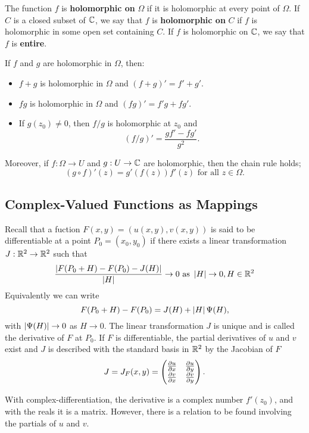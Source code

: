 \documentclass{exam}
\begin{document}
The function $f$ is \textbf{holomorphic on} $\Omega$ if it is holomorphic at every point of $\Omega$.
If $C$ is a closed subset of $\mathbb{C}$, we say that $f$ is \textbf{holomorphic on} $C$ if $f$ is holomorphic
in some open set containing $C$. If $f$ is holomorphic on $\mathbb{C}$, we say that $f$ is \textbf{entire}.

\newpage
\noqed
\begin{proposition}\label{prop:main}
    If $f$ and $g$ are holomorphic in $\Omega$, then:
    \begin{itemize}
        \item $f + g$ is holomorphic in $\Omega$ and $(f + g)' = f' + g'$.

        \item $fg$ is holomorphic in $\Omega$ and $(fg)' = f'g + fg'$.

        \item If $g(z_0) \neq 0$, then $f/g$ is holomorphic at $z_0$ and
        $$(f/g)' = \frac{gf' - fg'}{g^2}.$$
    \end{itemize}

    Moreover, if $f: \Omega\to U$ and $g: U\to\mathbb{C}$ are holomorphic, then the chain rule holds;
    $$(g\circ f)'(z) = g'(f(z))f'(z) \text{ for all } z\in\Omega.$$
\end{proposition}
\yesqed


\subsection*{Complex-Valued Functions as Mappings}
Recall that a fuction $F(x, y) = (u(x, y), v(x, y))$ is said to be differentiable at a point $P_0 = (x_0, y_0)$ if there exists a linear
transformation $J: \mathbb {R}^2\to\mathbb {R}^2$ such that
$$\frac{\left| F(P_0 + H) - F(P_0) - J(H) \right|}{\left| H \right|} \to 0 \text{ as } \left| H \right|\to 0, H\in\mathbb {R}^2$$
Equivalently we can write
$$F(P_0 + H) - F(P_0) = J(H) + \left| H \right|\Psi(H),$$
with $\left| \Psi(H) \right| \to 0$ as $H \to 0$. The linear transformation $J$ is unique and is called the derivative of $F$ at $P_0$. If $F$ is
differentiable, the partial derivatives of $u$ and $v$ exist and $J$ is described with the standard basis in $\mathbb {R}^2$ by the Jacobian of $F$
$$J = J_F(x, y) = 
\left( \begin{matrix}
    \frac{\partial u}{\partial x} & \frac{\partial u}{\partial y} \\
    \frac{\partial v}{\partial x} & \frac{\partial v}{\partial y}
\end{matrix} \right).$$

With complex-differentiation, the derivative is a complex number $f'(z_0)$, and with the reals it is a matrix. However, there is a relation
to be found involving the partials of $u$ and $v$.
\end{document}

